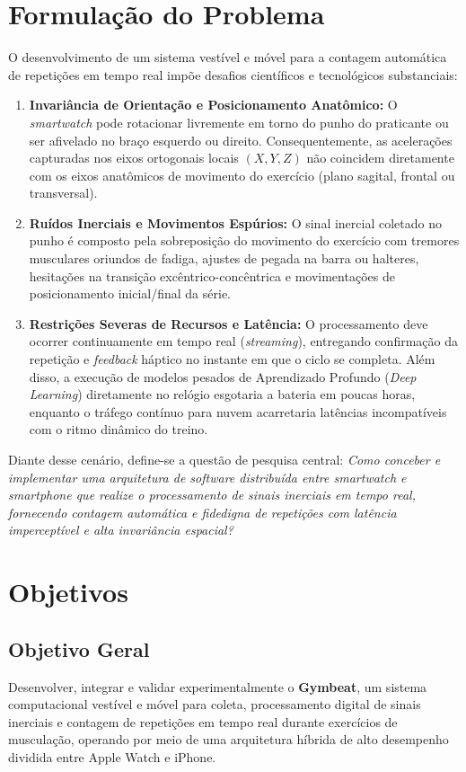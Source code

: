 \documentclass[12pt,openany,oneside,a4paper,english,brazil]{abntex2}
\begin{document}
\section{Formulação do Problema}
O desenvolvimento de um sistema vestível e móvel para a contagem automática de repetições em tempo real impõe desafios científicos e tecnológicos substanciais:
\begin{enumerate}
    \item \textbf{Invariância de Orientação e Posicionamento Anatômico:} O \textit{smartwatch} pode rotacionar livremente em torno do punho do praticante ou ser afivelado no braço esquerdo ou direito. Consequentemente, as acelerações capturadas nos eixos ortogonais locais $(X, Y, Z)$ não coincidem diretamente com os eixos anatômicos de movimento do exercício (plano sagital, frontal ou transversal).
    \item \textbf{Ruídos Inerciais e Movimentos Espúrios:} O sinal inercial coletado no punho é composto pela sobreposição do movimento do exercício com tremores musculares oriundos de fadiga, ajustes de pegada na barra ou halteres, hesitações na transição excêntrico-concêntrica e movimentações de posicionamento inicial/final da série.
    \item \textbf{Restrições Severas de Recursos e Latência:} O processamento deve ocorrer continuamente em tempo real (\textit{streaming}), entregando confirmação da repetição e \textit{feedback} háptico no instante em que o ciclo se completa. Além disso, a execução de modelos pesados de Aprendizado Profundo (\textit{Deep Learning}) diretamente no relógio esgotaria a bateria em poucas horas, enquanto o tráfego contínuo para nuvem acarretaria latências incompatíveis com o ritmo dinâmico do treino.
\end{enumerate}

Diante desse cenário, define-se a questão de pesquisa central: \textit{Como conceber e implementar uma arquitetura de software distribuída entre smartwatch e smartphone que realize o processamento de sinais inerciais em tempo real, fornecendo contagem automática e fidedigna de repetições com latência imperceptível e alta invariância espacial?}

\section{Objetivos}

\subsection{Objetivo Geral}
Desenvolver, integrar e validar experimentalmente o \textbf{Gymbeat}, um sistema computacional vestível e móvel para coleta, processamento digital de sinais inerciais e contagem de repetições em tempo real durante exercícios de musculação, operando por meio de uma arquitetura híbrida de alto desempenho dividida entre Apple Watch e iPhone.
\end{document}
